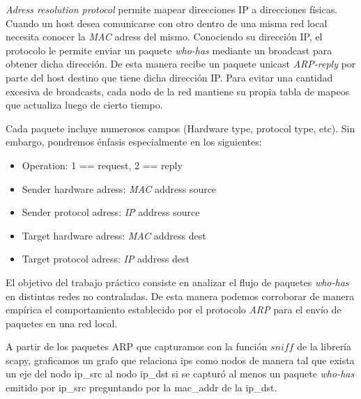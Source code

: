 \emph{Adress resolution protocol} permite mapear direcciones IP a direcciones físicas. Cuando un host desea comunicarse con otro
dentro de una misma red local necesita conocer la \emph{MAC} adress del mismo. Conociendo su dirección IP, el protocolo le permite
enviar un paquete \emph{who-has} mediante un broadcast para obtener dicha dirección. De esta manera recibe un paquete unicast
\emph{ARP-reply} por parte del host destino que tiene dicha dirección IP.
Para evitar una cantidad excesiva de broadcasts, cada nodo de la red mantiene su propia tabla de mapeos que actualiza luego de cierto tiempo.

Cada paquete incluye numerosos campos (Hardware type, protocol type, etc). Sin embargo, pondremos énfasis especialmente en los siguientes:
\begin{itemize}
    \item Operation: 1 == request, 2 == reply
    \item Sender hardware adress: \emph{MAC} address source
    \item Sender protocol adress: \emph{IP} address source
    \item Target hardware adress: \emph{MAC} address dest
    \item Target protocol adress: \emph{IP} address dest
\end{itemize}

El objetivo del trabajo práctico consiste en analizar el flujo de paquetes \emph{who-has} en distintas redes 
no contraladas. De esta manera podemos corroborar de manera empírica el comportamiento establecido por el protocolo \emph{ARP} 
para el envío de paquetes en una red local.  







A partir de los paquetes ARP que capturamos con la función $sniff$ de la librería scapy, graficamos un grafo que relaciona ips como 
nodos de manera tal que exista un eje del nodo ip\_src al nodo ip\_dst si se capturó al menos un paquete \emph{who-has} emitido por 
ip\_src preguntando por la mac\_addr de la ip\_dst.

